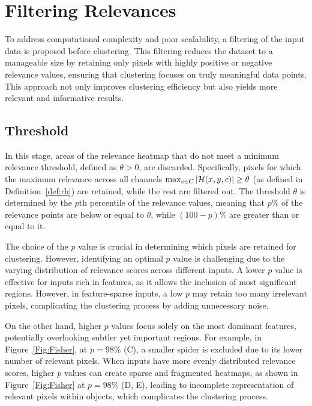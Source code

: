 \section{Filtering Relevances}
\label{sec:filtering}

To address computational complexity and poor scalability, a filtering of the input data is proposed before clustering. This filtering reduces the dataset to a manageable size by retaining only pixels with highly positive or negative relevance values, ensuring that clustering focuses on truly meaningful data points. This approach not only improves clustering efficiency but also yields more relevant and informative results.

\subsection{Threshold}

In this stage, areas of the relevance heatmap that do not meet a minimum relevance threshold, defined as \( \theta > 0 \), are discarded. Specifically, pixels for which the maximum relevance across all channels \( \max_{c \in C} |\mathcal{H}(x, y, c)| \geq \theta \) (as defined in Definition~\ref{def:rh}) are retained, while the rest are filtered out. The threshold \( \theta \) is determined by the \( p \)th percentile of the relevance values, meaning that \( p\% \) of the relevance points are below or equal to \( \theta \), while \( (100 - p)\% \) are greater than or equal to it.

The choice of the \( p \) value is crucial in determining which pixels are retained for clustering. However, identifying an optimal \( p \) value is challenging due to the varying distribution of relevance scores across different inputs. A lower \( p \) value is effective for inputs rich in features, as it allows the inclusion of most significant regions. However, in feature-sparse inputs, a low \( p \) may retain too many irrelevant pixels, complicating the clustering process by adding unnecessary noise.

On the other hand, higher \( p \) values focus solely on the most dominant features, potentially overlooking subtler yet important regions. For example, in Figure~\ref{Fig:Fisher}, at \( p = 98\% \) (C), a smaller spider is excluded due to its lower number of relevant pixels. When inputs have more evenly distributed relevance scores, higher \( p \) values can create sparse and fragmented heatmaps, as shown in Figure~\ref{Fig:Fisher} at \( p = 98\% \) (D, E), leading to incomplete representation of relevant pixels within objects, which complicates the clustering process.

